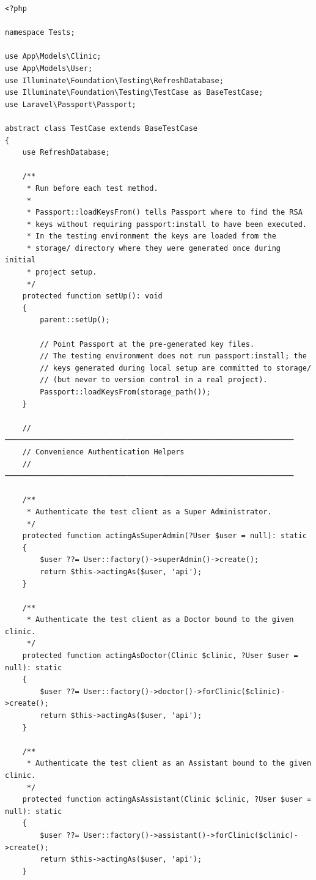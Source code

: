 \begin{lstlisting}[style=php, caption={\texttt{tests/TestCase.php} ---
  Base test case with Passport configuration and shared helpers.}]
<?php

namespace Tests;

use App\Models\Clinic;
use App\Models\User;
use Illuminate\Foundation\Testing\RefreshDatabase;
use Illuminate\Foundation\Testing\TestCase as BaseTestCase;
use Laravel\Passport\Passport;

abstract class TestCase extends BaseTestCase
{
    use RefreshDatabase;

    /**
     * Run before each test method.
     *
     * Passport::loadKeysFrom() tells Passport where to find the RSA
     * keys without requiring passport:install to have been executed.
     * In the testing environment the keys are loaded from the
     * storage/ directory where they were generated once during initial
     * project setup.
     */
    protected function setUp(): void
    {
        parent::setUp();

        // Point Passport at the pre-generated key files.
        // The testing environment does not run passport:install; the
        // keys generated during local setup are committed to storage/
        // (but never to version control in a real project).
        Passport::loadKeysFrom(storage_path());
    }

    // ──────────────────────────────────────────────────────────────────
    // Convenience Authentication Helpers
    // ──────────────────────────────────────────────────────────────────

    /**
     * Authenticate the test client as a Super Administrator.
     */
    protected function actingAsSuperAdmin(?User $user = null): static
    {
        $user ??= User::factory()->superAdmin()->create();
        return $this->actingAs($user, 'api');
    }

    /**
     * Authenticate the test client as a Doctor bound to the given clinic.
     */
    protected function actingAsDoctor(Clinic $clinic, ?User $user = null): static
    {
        $user ??= User::factory()->doctor()->forClinic($clinic)->create();
        return $this->actingAs($user, 'api');
    }

    /**
     * Authenticate the test client as an Assistant bound to the given clinic.
     */
    protected function actingAsAssistant(Clinic $clinic, ?User $user = null): static
    {
        $user ??= User::factory()->assistant()->forClinic($clinic)->create();
        return $this->actingAs($user, 'api');
    }


\end{lstlisting}
